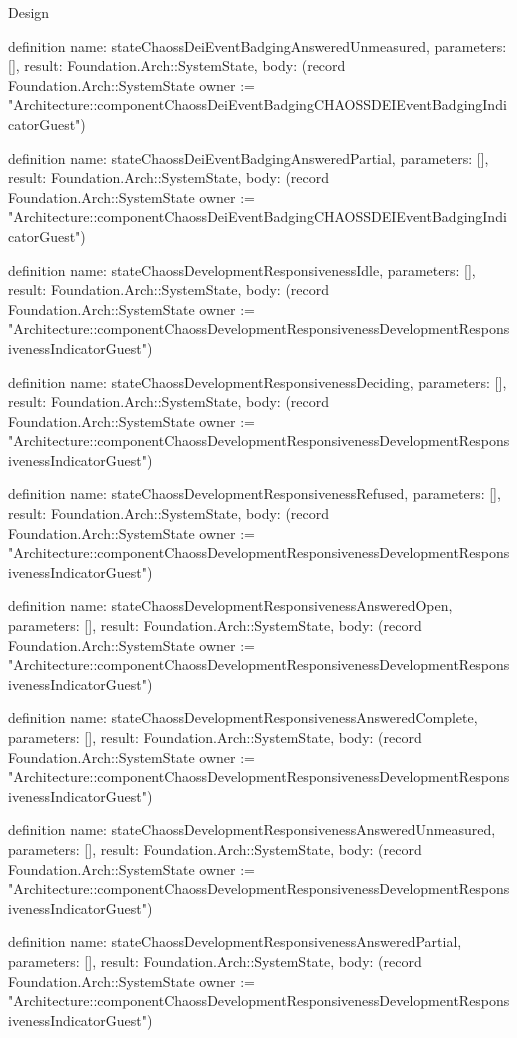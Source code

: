 \begin{lexlean}{Design}
\begin{semanticmodule}
definition{
  name: stateChaossDeiEventBadgingAnsweredUnmeasured,
  parameters: [],
  result: Foundation.Arch::SystemState,
  body: (record Foundation.Arch::SystemState {owner := "Architecture::componentChaossDeiEventBadgingCHAOSSDEIEventBadgingIndicatorGuest"})
}

definition{
  name: stateChaossDeiEventBadgingAnsweredPartial,
  parameters: [],
  result: Foundation.Arch::SystemState,
  body: (record Foundation.Arch::SystemState {owner := "Architecture::componentChaossDeiEventBadgingCHAOSSDEIEventBadgingIndicatorGuest"})
}

definition{
  name: stateChaossDevelopmentResponsivenessIdle,
  parameters: [],
  result: Foundation.Arch::SystemState,
  body: (record Foundation.Arch::SystemState {owner := "Architecture::componentChaossDevelopmentResponsivenessDevelopmentResponsivenessIndicatorGuest"})
}

definition{
  name: stateChaossDevelopmentResponsivenessDeciding,
  parameters: [],
  result: Foundation.Arch::SystemState,
  body: (record Foundation.Arch::SystemState {owner := "Architecture::componentChaossDevelopmentResponsivenessDevelopmentResponsivenessIndicatorGuest"})
}

definition{
  name: stateChaossDevelopmentResponsivenessRefused,
  parameters: [],
  result: Foundation.Arch::SystemState,
  body: (record Foundation.Arch::SystemState {owner := "Architecture::componentChaossDevelopmentResponsivenessDevelopmentResponsivenessIndicatorGuest"})
}

definition{
  name: stateChaossDevelopmentResponsivenessAnsweredOpen,
  parameters: [],
  result: Foundation.Arch::SystemState,
  body: (record Foundation.Arch::SystemState {owner := "Architecture::componentChaossDevelopmentResponsivenessDevelopmentResponsivenessIndicatorGuest"})
}

definition{
  name: stateChaossDevelopmentResponsivenessAnsweredComplete,
  parameters: [],
  result: Foundation.Arch::SystemState,
  body: (record Foundation.Arch::SystemState {owner := "Architecture::componentChaossDevelopmentResponsivenessDevelopmentResponsivenessIndicatorGuest"})
}

definition{
  name: stateChaossDevelopmentResponsivenessAnsweredUnmeasured,
  parameters: [],
  result: Foundation.Arch::SystemState,
  body: (record Foundation.Arch::SystemState {owner := "Architecture::componentChaossDevelopmentResponsivenessDevelopmentResponsivenessIndicatorGuest"})
}

definition{
  name: stateChaossDevelopmentResponsivenessAnsweredPartial,
  parameters: [],
  result: Foundation.Arch::SystemState,
  body: (record Foundation.Arch::SystemState {owner := "Architecture::componentChaossDevelopmentResponsivenessDevelopmentResponsivenessIndicatorGuest"})
}


\end{semanticmodule}
\end{lexlean}
